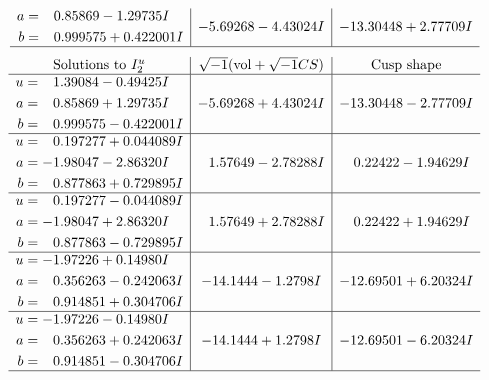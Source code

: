 \documentclass[1p]{elsarticle_modified}
\theoremstyle{definition}
\newcommand{\I}{\sqrt{-1}}
\begin{document}
$$\begin{array}{c|c|c}
\begin{aligned}
a &= \phantom{-}0.85869 - 1.29735 I \\
b &= \phantom{-}0.999575 + 0.422001 I\end{aligned}
 & -5.69268 - 4.43024 I & -13.30448 + 2.77709 I\\
 \hline 
 \end{array}$$\newpage$$\begin{array}{c|c|c}  
\text{Solutions to }I^u_{2}& \I (\text{vol} + \sqrt{-1}CS) & \text{Cusp shape}\\
 \hline 
\begin{aligned}
u &= \phantom{-}1.39084 - 0.49425 I \\
a &= \phantom{-}0.85869 + 1.29735 I \\
b &= \phantom{-}0.999575 - 0.422001 I\end{aligned}
 & -5.69268 + 4.43024 I & -13.30448 - 2.77709 I \\ \hline\begin{aligned}
u &= \phantom{-}0.197277 + 0.044089 I \\
a &= -1.98047 - 2.86320 I \\
b &= \phantom{-}0.877863 + 0.729895 I\end{aligned}
 & \phantom{-}1.57649 - 2.78288 I & \phantom{-}0.22422 - 1.94629 I \\ \hline\begin{aligned}
u &= \phantom{-}0.197277 - 0.044089 I \\
a &= -1.98047 + 2.86320 I \\
b &= \phantom{-}0.877863 - 0.729895 I\end{aligned}
 & \phantom{-}1.57649 + 2.78288 I & \phantom{-}0.22422 + 1.94629 I \\ \hline\begin{aligned}
u &= -1.97226 + 0.14980 I \\
a &= \phantom{-}0.356263 - 0.242063 I \\
b &= \phantom{-}0.914851 + 0.304706 I\end{aligned}
 & -14.1444 - 1.2798 I & -12.69501 + 6.20324 I \\ \hline\begin{aligned}
u &= -1.97226 - 0.14980 I \\
a &= \phantom{-}0.356263 + 0.242063 I \\
b &= \phantom{-}0.914851 - 0.304706 I\end{aligned}
 & -14.1444 + 1.2798 I & -12.69501 - 6.20324 I\\
 \hline 
 \end{array}$$\newpage\newpage\renewcommand{\arraystretch}{1}
\end{document}
